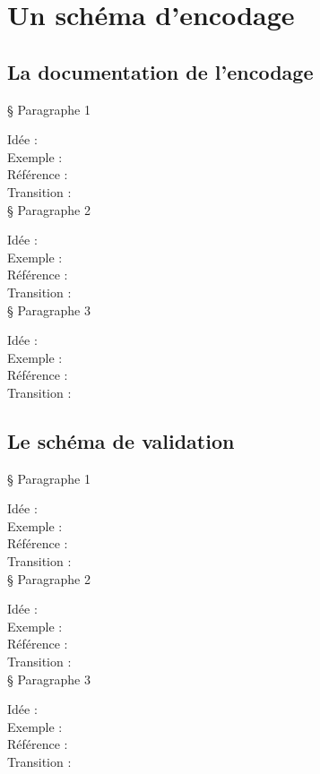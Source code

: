  \section{Un schéma d’encodage}
    \subsection{La documentation de l’encodage}

§ Paragraphe 1

Idée :\\
Exemple :\\
Référence :\\
Transition :\\

§ Paragraphe 2

Idée :\\
Exemple :\\
Référence :\\
Transition :\\

§ Paragraphe 3

Idée :\\
Exemple :\\
Référence :\\
Transition :\\

\subsection{Le schéma de validation}

§ Paragraphe 1

Idée :\\
Exemple :\\
Référence :\\
Transition :\\

§ Paragraphe 2

Idée :\\
Exemple :\\
Référence :\\
Transition :\\

§ Paragraphe 3

Idée :\\
Exemple :\\
Référence :\\
Transition :\\

